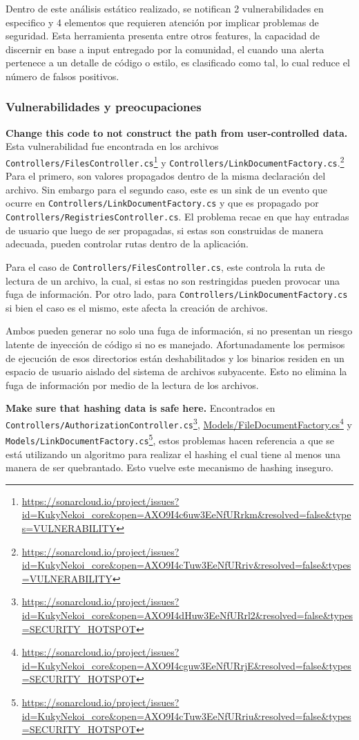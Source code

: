 Dentro de este análisis estático realizado, se notifican 2 vulnerabilidades en especifico y 4 elementos que requieren atención por implicar problemas de seguridad. Esta herramienta presenta entre otros features, la capacidad de discernir en base a input entregado por la comunidad, el cuando una alerta pertenece a un detalle de código o estilo, es clasificado como tal, lo cual reduce el número de falsos positivos.

\subsubsection{Vulnerabilidades y preocupaciones}

\textbf{Change this code to not construct the path from user-controlled data.} Esta vulnerabilidad fue encontrada en los archivos \texttt{Controllers/FilesController.cs}\footnote{\url{https://sonarcloud.io/project/issues?id=KukyNekoi_core&open=AXO9I4c6uw3EeNfURrkm&resolved=false&types=VULNERABILITY}} y \texttt{Controllers/LinkDocumentFactory.cs}.\footnote{\url{https://sonarcloud.io/project/issues?id=KukyNekoi_core&open=AXO9I4cTuw3EeNfURriv&resolved=false&types=VULNERABILITY}} Para el primero, son valores propagados dentro de la misma declaración del archivo. Sin embargo para el segundo caso, este es un sink de un evento que ocurre en \texttt{Controllers/LinkDocumentFactory.cs} y que es propagado por \texttt{Controllers/RegistriesController.cs}. El problema recae en que hay entradas de usuario que luego de ser propagadas, si estas son construidas de manera adecuada, pueden controlar rutas dentro de la aplicación. 

Para el caso de \texttt{Controllers/FilesController.cs}, este controla la ruta de lectura de un archivo, la cual, si estas no son restringidas pueden provocar una fuga de información. Por otro lado, para \texttt{Controllers/LinkDocumentFactory.cs} si bien el caso es el mismo, este afecta la creación de archivos.

Ambos pueden generar no solo una fuga de información, si no presentan un riesgo latente de inyección de código si no es manejado. Afortunadamente los permisos de ejecución de esos directorios están deshabilitados y los binarios residen en un espacio de usuario aislado del sistema de archivos subyacente. Esto no elimina la fuga de información por medio de la lectura de los archivos.

\textbf{Make sure that hashing data is safe here.} Encontrados en \texttt{Controllers/AuthorizationController.cs}\footnote{\url{https://sonarcloud.io/project/issues?id=KukyNekoi_core&open=AXO9I4dHuw3EeNfURrl2&resolved=false&types=SECURITY_HOTSPOT}}, \url{Models/FileDocumentFactory.cs}\footnote{\url{https://sonarcloud.io/project/issues?id=KukyNekoi_core&open=AXO9I4cguw3EeNfURrjE&resolved=false&types=SECURITY_HOTSPOT}} y \texttt{Models/LinkDocumentFactory.cs}\footnote{\url{https://sonarcloud.io/project/issues?id=KukyNekoi_core&open=AXO9I4cTuw3EeNfURriu&resolved=false&types=SECURITY_HOTSPOT}}, estos problemas hacen referencia a que se está utilizando un algoritmo para realizar el hashing el cual tiene al menos una manera de ser quebrantado. Esto vuelve este mecanismo de hashing inseguro.

